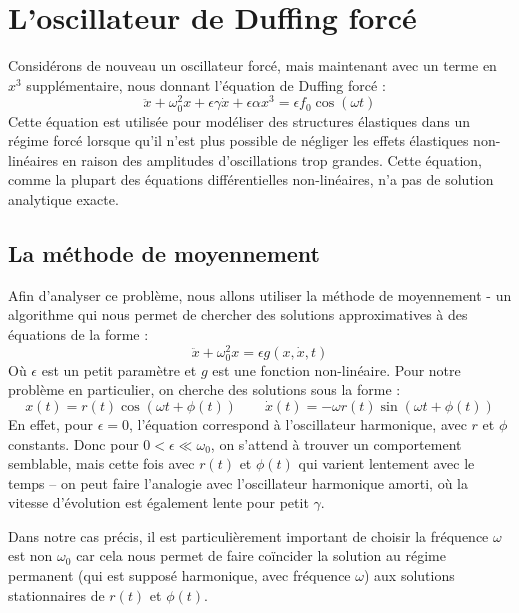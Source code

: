 \chapter{L'oscillateur de Duffing forcé}
%
Considérons de nouveau un oscillateur forcé, mais maintenant avec un terme en $x^3$ supplémentaire, nous donnant l'équation de Duffing forcé :
%
%
\begin{equation}
    \ddot{x} + \omega_0^2 x + \epsilon \gamma \dot{x} + \epsilon \alpha x^3 = \epsilon f_0 \cos(\omega t)
    \label{eq:duffing}
\end{equation}
%
Cette équation est utilisée pour modéliser des structures élastiques dans un régime forcé lorsque qu'il n'est plus possible de négliger les effets élastiques non-linéaires en raison des amplitudes d'oscillations trop grandes.
Cette équation, comme la plupart des équations différentielles non-linéaires, n'a pas de solution analytique exacte.
%
\section{La méthode de moyennement}
%
Afin d'analyser ce problème, nous allons utiliser la méthode de 
moyennement \cite{rand_lecture_2012} - un algorithme %
qui nous permet de chercher des solutions approximatives à des équations de la forme :
\begin{equation}
    \ddot{x} + \omega_0^2 x = \epsilon g(x, \dot{x}, t)
\end{equation}
Où $\epsilon$ est un petit paramètre et $g$ est une fonction non-linéaire. Pour notre problème en particulier, on cherche des solutions sous la forme :
\begin{equation}
x(t) = r(t)\cos(\omega t + \phi(t)) \qquad \dot{x}(t) =  -\omega r(t)\sin(\omega t + \phi(t))
\label{eq:duff_x_xdot}
\end{equation}
%
En effet, pour $\epsilon=0$, l'équation correspond à l'oscillateur harmonique, avec $r$ et $\phi$ constants.
Donc pour $0 < \epsilon \ll \omega_0$, on s'attend à trouver un comportement semblable, mais cette fois avec $r(t)$ et $\phi(t)$ 
qui varient lentement avec le temps – on peut faire l'analogie avec l'oscillateur harmonique amorti, où la vitesse d'évolution est également lente pour petit $\gamma$.

Dans notre cas précis, il est particulièrement important de choisir la fréquence $\omega$ est non $\omega_0$ car cela nous permet de faire coïncider la solution au régime permanent (qui est supposé harmonique, avec fréquence $\omega$)
aux solutions stationnaires de $r(t)$ et $\phi(t)$. 

